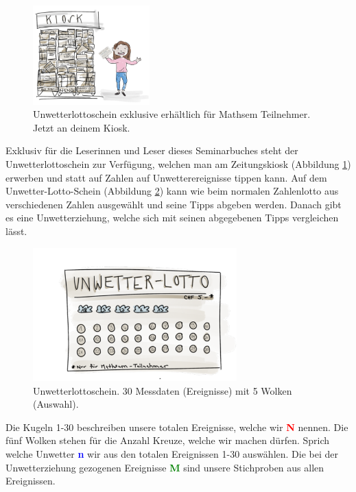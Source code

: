 \begin{refsection}
\begin{figure}[htbp]
\centering
\includegraphics[width=0.4\textwidth]{extrem/Kiosk.pdf}
\caption{Unwetterlottoschein exklusive erhältlich für Mathsem Teilnehmer. Jetzt an deinem Kiosk.}
\label{Kiosk}
\end{figure}

Exklusiv für die Leserinnen und Leser dieses Seminarbuches steht der Unwetterlottoschein zur Verfügung, welchen man am Zeitungskiosk (Abbildung \ref{Kiosk}) erwerben und statt auf Zahlen auf Unwetterereignisse tippen kann. Auf dem Unwetter-Lotto-Schein (Abbildung \ref{Lottoschein}) kann wie beim normalen Zahlenlotto aus verschiedenen Zahlen ausgewählt und seine Tipps abgeben werden. Danach gibt es eine Unwetterziehung, welche sich mit seinen abgegebenen Tipps vergleichen lässt.

\begin{figure}[htbp]
\centering
\includegraphics[width=0.7\textwidth]{extrem/Lottoschein.pdf}
\caption{Unwetterlottoschein. 30 Messdaten (Ereignisse) mit 5 Wolken (Auswahl).}
\label{Lottoschein}
\end{figure}

Die Kugeln 1-30 beschreiben unsere totalen Ereignisse, welche wir \textcolor{red}{\textbf{N}} nennen. Die fünf Wolken stehen für die Anzahl Kreuze, welche wir machen dürfen. Sprich welche Unwetter \textcolor{blue}{\textbf{n}} wir aus den totalen Ereignissen 1-30 auswählen. Die bei der Unwetterziehung gezogenen Ereignisse \textcolor{green}{\textbf{M}} sind unsere Stichproben aus allen Ereignissen.


\end{refsection}
